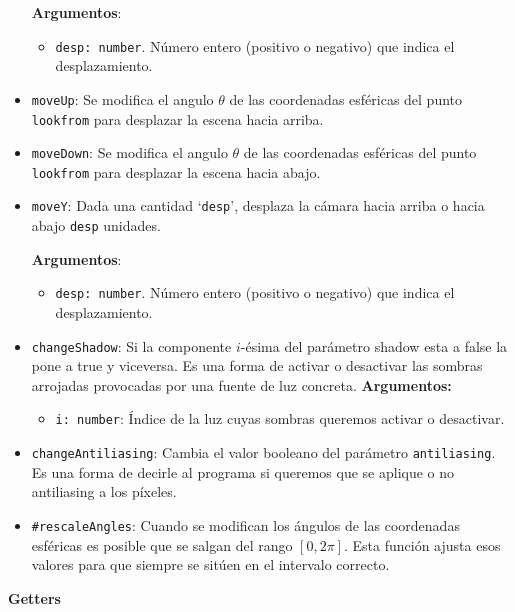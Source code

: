 \begin{itemize}
    \textbf{Argumentos}:
    \begin{itemize}
        \item \verb|desp: number|. Número entero (positivo o negativo) que indica el desplazamiento.
    \end{itemize}
    \item \verb|moveUp|: Se modifica el angulo $\theta$ de las coordenadas esféricas del punto \verb|lookfrom| para desplazar la escena hacia arriba.
    \item \verb|moveDown|: Se modifica el angulo $\theta$ de las coordenadas esféricas del punto \verb|lookfrom| para desplazar la escena hacia abajo.
    \item \verb|moveY|: Dada una cantidad `\verb|desp|', desplaza la cámara hacia arriba o hacia abajo \verb|desp| unidades.

    \textbf{Argumentos}:
    \begin{itemize}
        \item \verb|desp: number|. Número entero (positivo o negativo) que indica el desplazamiento.
    \end{itemize}
    \item \verb|changeShadow|: Si la componente $i$-ésima del parámetro shadow esta a false la pone a true y viceversa. Es una forma de activar o desactivar las sombras arrojadas provocadas por una fuente de luz concreta.
    \textbf{Argumentos:}
    \begin{itemize}
        \item \verb|i: number|: Índice de la luz cuyas sombras queremos activar o desactivar.
    \end{itemize}
    \item \verb|changeAntiliasing|: Cambia el valor booleano del parámetro \verb|antiliasing|. Es una forma de decirle al programa si queremos que se aplique o no antiliasing a los píxeles.
    \item \verb|#rescaleAngles|: Cuando se modifican los ángulos de las coordenadas esféricas es posible que se salgan del rango $[0, 2\pi]$. Esta función ajusta esos valores para que siempre se sitúen en el intervalo correcto.
\end{itemize}
\textbf{Getters}

